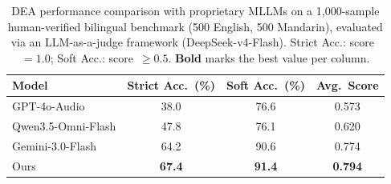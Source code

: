 \begin{table}[t]
\centering
\small
\begin{tabular}{lccc}
\toprule
Model & Strict Acc.\ (\%) & Soft Acc.\ (\%) & Avg.\ Score \\
\midrule
GPT-4o-Audio & 38.0 & 76.6 & 0.573 \\
Qwen3.5-Omni-Flash & 47.8 & 76.1 & 0.620 \\
Gemini-3.0-Flash & 64.2 & 90.6 & 0.774 \\
Ours & \textbf{67.4} & \textbf{91.4} & \textbf{0.794} \\
\bottomrule
\end{tabular}
\caption{DEA performance comparison with proprietary MLLMs on a 1,000-sample human-verified bilingual benchmark (500 English, 500 Mandarin), evaluated via an LLM-as-a-judge framework (DeepSeek-v4-Flash). Strict Acc.: score~$= 1.0$; Soft Acc.: score~$\ge 0.5$. \textbf{Bold} marks the best value per column.}%
\label{tab:dea_results}
\end{table}
